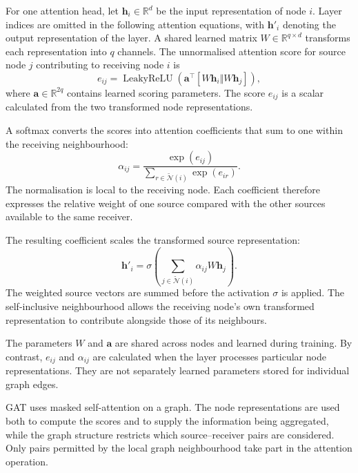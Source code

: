 \documentclass[11pt,a4paper]{article}
\begin{document}
For one attention head, let \(\mathbf{h}_i\in\mathbb{R}^{d}\) be the input representation of node \(i\). Layer indices are omitted in the following attention equations, with \(\mathbf{h}'_i\) denoting the output representation of the layer. A shared learned matrix \(W\in\mathbb{R}^{q\times d}\) transforms each representation into \(q\) channels. The unnormalised attention score for source node \(j\) contributing to receiving node \(i\) is
\begin{equation}
e_{ij}
=
\operatorname{LeakyReLU}
\!\left(
\mathbf{a}^{\top}
[W\mathbf{h}_i\Vert W\mathbf{h}_j]
\right),
\label{eq:gat-score}
\end{equation}
where \(\mathbf{a}\in\mathbb{R}^{2q}\) contains learned scoring parameters. The score \(e_{ij}\) is a scalar calculated from the two transformed node representations.

A softmax converts the scores into attention coefficients that sum to one within the receiving neighbourhood:
\begin{equation}
\alpha_{ij}
=
\frac{\exp(e_{ij})}
{\sum_{r\in\widetilde{\mathcal{N}}(i)}
\exp(e_{ir})}.
\label{eq:gat-softmax}
\end{equation}
The normalisation is local to the receiving node. Each coefficient therefore expresses the relative weight of one source compared with the other sources available to the same receiver.

The resulting coefficient scales the transformed source representation:
\begin{equation}
\mathbf{h}'_i
=
\sigma\!\left(
\sum_{j\in\widetilde{\mathcal{N}}(i)}
\alpha_{ij}
W\mathbf{h}_j
\right).
\label{eq:gat-update}
\end{equation}
The weighted source vectors are summed before the activation \(\sigma\) is applied. The self-inclusive neighbourhood allows the receiving node's own transformed representation to contribute alongside those of its neighbours.

The parameters \(W\) and \(\mathbf{a}\) are shared across nodes and learned during training. By contrast, \(e_{ij}\) and \(\alpha_{ij}\) are calculated when the layer processes particular node representations. They are not separately learned parameters stored for individual graph edges.

GAT uses masked self-attention on a graph. The node representations are used both to compute the scores and to supply the information being aggregated, while the graph structure restricts which source--receiver pairs are considered. Only pairs permitted by the local graph neighbourhood take part in the attention operation.
\end{document}
